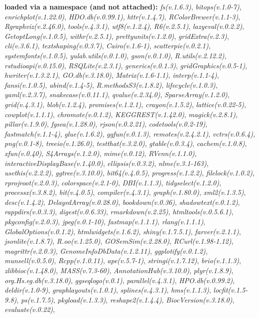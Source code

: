 \documentclass[
]{book}
\begin{document}
\textbf{loaded via a namespace (and not attached):}
\emph{fs(v.1.6.3)}, \emph{bitops(v.1.0-7)}, \emph{enrichplot(v.1.22.0)}, \emph{HDO.db(v.0.99.1)}, \emph{httr(v.1.4.7)}, \emph{RColorBrewer(v.1.1-3)}, \emph{Rgraphviz(v.2.46.0)}, \emph{tools(v.4.3.1)}, \emph{utf8(v.1.2.4)}, \emph{R6(v.2.5.1)}, \emph{lazyeval(v.0.2.2)}, \emph{GetoptLong(v.1.0.5)}, \emph{withr(v.2.5.1)}, \emph{prettyunits(v.1.2.0)}, \emph{gridExtra(v.2.3)}, \emph{cli(v.3.6.1)}, \emph{textshaping(v.0.3.7)}, \emph{Cairo(v.1.6-1)}, \emph{scatterpie(v.0.2.1)}, \emph{systemfonts(v.1.0.5)}, \emph{yulab.utils(v.0.1.0)}, \emph{gson(v.0.1.0)}, \emph{R.utils(v.2.12.2)}, \emph{rstudioapi(v.0.15.0)}, \emph{RSQLite(v.2.3.1)}, \emph{generics(v.0.1.3)}, \emph{gridGraphics(v.0.5-1)}, \emph{hwriter(v.1.3.2.1)}, \emph{GO.db(v.3.18.0)}, \emph{Matrix(v.1.6-1.1)}, \emph{interp(v.1.1-4)}, \emph{fansi(v.1.0.5)}, \emph{abind(v.1.4-5)}, \emph{R.methodsS3(v.1.8.2)}, \emph{lifecycle(v.1.0.3)}, \emph{yaml(v.2.3.7)}, \emph{snakecase(v.0.11.1)}, \emph{qvalue(v.2.34.0)}, \emph{SparseArray(v.1.2.0)}, \emph{grid(v.4.3.1)}, \emph{blob(v.1.2.4)}, \emph{promises(v.1.2.1)}, \emph{crayon(v.1.5.2)}, \emph{lattice(v.0.22-5)}, \emph{cowplot(v.1.1.1)}, \emph{chromote(v.0.1.2)}, \emph{KEGGREST(v.1.42.0)}, \emph{magick(v.2.8.1)}, \emph{pillar(v.1.9.0)}, \emph{fgsea(v.1.28.0)}, \emph{rjson(v.0.2.21)}, \emph{codetools(v.0.2-19)}, \emph{fastmatch(v.1.1-4)}, \emph{glue(v.1.6.2)}, \emph{ggfun(v.0.1.3)}, \emph{remotes(v.2.4.2.1)}, \emph{vctrs(v.0.6.4)}, \emph{png(v.0.1-8)}, \emph{treeio(v.1.26.0)}, \emph{testthat(v.3.2.0)}, \emph{gtable(v.0.3.4)}, \emph{cachem(v.1.0.8)}, \emph{xfun(v.0.40)}, \emph{S4Arrays(v.1.2.0)}, \emph{mime(v.0.12)}, \emph{RVenn(v.1.1.0)}, \emph{interactiveDisplayBase(v.1.40.0)}, \emph{ellipsis(v.0.3.2)}, \emph{nlme(v.3.1-163)}, \emph{usethis(v.2.2.2)}, \emph{ggtree(v.3.10.0)}, \emph{bit64(v.4.0.5)}, \emph{progress(v.1.2.2)}, \emph{filelock(v.1.0.2)}, \emph{rprojroot(v.2.0.3)}, \emph{colorspace(v.2.1-0)}, \emph{DBI(v.1.1.3)}, \emph{tidyselect(v.1.2.0)}, \emph{processx(v.3.8.2)}, \emph{bit(v.4.0.5)}, \emph{compiler(v.4.3.1)}, \emph{graph(v.1.80.0)}, \emph{xml2(v.1.3.5)}, \emph{desc(v.1.4.2)}, \emph{DelayedArray(v.0.28.0)}, \emph{bookdown(v.0.36)}, \emph{shadowtext(v.0.1.2)}, \emph{rappdirs(v.0.3.3)}, \emph{digest(v.0.6.33)}, \emph{rmarkdown(v.2.25)}, \emph{htmltools(v.0.5.6.1)}, \emph{pkgconfig(v.2.0.3)}, \emph{jpeg(v.0.1-10)}, \emph{fastmap(v.1.1.1)}, \emph{rlang(v.1.1.1)}, \emph{GlobalOptions(v.0.1.2)}, \emph{htmlwidgets(v.1.6.2)}, \emph{shiny(v.1.7.5.1)}, \emph{farver(v.2.1.1)}, \emph{jsonlite(v.1.8.7)}, \emph{R.oo(v.1.25.0)}, \emph{GOSemSim(v.2.28.0)}, \emph{RCurl(v.1.98-1.12)}, \emph{magrittr(v.2.0.3)}, \emph{GenomeInfoDbData(v.1.2.11)}, \emph{ggplotify(v.0.1.2)}, \emph{munsell(v.0.5.0)}, \emph{Rcpp(v.1.0.11)}, \emph{ape(v.5.7-1)}, \emph{stringi(v.1.7.12)}, \emph{brio(v.1.1.3)}, \emph{zlibbioc(v.1.48.0)}, \emph{MASS(v.7.3-60)}, \emph{AnnotationHub(v.3.10.0)}, \emph{plyr(v.1.8.9)}, \emph{org.Hs.eg.db(v.3.18.0)}, \emph{ggseqlogo(v.0.1)}, \emph{parallel(v.4.3.1)}, \emph{HPO.db(v.0.99.2)}, \emph{deldir(v.1.0-9)}, \emph{graphlayouts(v.1.0.1)}, \emph{splines(v.4.3.1)}, \emph{hms(v.1.1.3)}, \emph{locfit(v.1.5-9.8)}, \emph{ps(v.1.7.5)}, \emph{pkgload(v.1.3.3)}, \emph{reshape2(v.1.4.4)}, \emph{BiocVersion(v.3.18.0)}, \emph{evaluate(v.0.22)}, 
\end{document}
